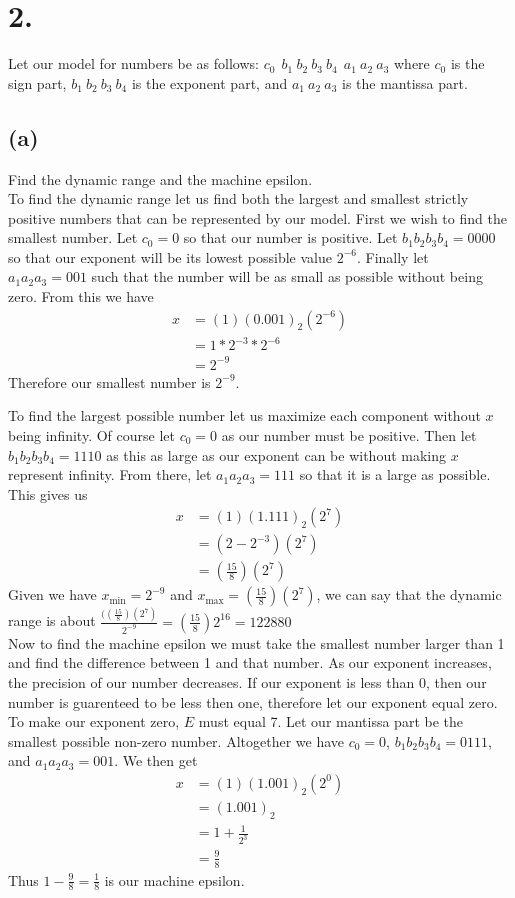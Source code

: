 \documentclass{article}
\begin{document}
\section*{2.}
	Let our model for numbers be as follows: $c_0 \ \ b_1 \ b_2 \ b_3 \ b_4
	\ \ a_1 \ a_2 \ a_3$ where $c_0$ is the sign part, $b_1 \ b_2 \ b_3 \ b_4$ is the exponent part,
	and $a_1 \ a_2 \ a_3$ is the mantissa part.
	\subsection*{(a)}
		Find the dynamic range and the machine epsilon. \\

		To find the dynamic range let us find both the largest and smallest strictly positive 
		numbers that can be represented by our model.
		First we wish to find the smallest number. Let $c_0 = 0$ so that our number is positive.
		Let $b_1 b_2 b_3 b_4 = 0000$ so that our exponent will be its lowest possible value $2^{-6}$.
		Finally let $a_1a_2a_3 = 001$ such that the number will be as small as possible without being zero.
		From this we have 
		\begin{align*}
			x & =(1)(0.001)_2(2^{-6})\\
			& = 1 * 2^{-3}*2^{-6} \\
			& = 2^{-9}
		\end{align*}
		Therefore our smallest number is $2^{-9}$.

		To find the largest possible number let us maximize each component without $x$ being infinity.
		Of course let $c_0 = 0$ as our number must be positive.
		Then let $b_1 b_2 b_3 b_4 = 1110$ as this as large as our exponent can be without making $x$ represent infinity.
		From there, let $a_1 a_2 a_3 = 111$ so that it is a large as possible.
		This gives us
		\begin{align*}
			x & = (1)(1.111)_2(2^{7}) \\
			& = (2 - 2^{-3})(2^{7}) \\ 
			& = (\frac{15}{8})(2^7)
		\end{align*}
		Given we have $x_{\text{min}} = 2^{-9}$ and $x_{\text{max}} = (\frac{15}{8})(2^7)$, we can say that the dynamic range
		is about $\frac{((\frac{15}{8})(2^7)}{2^{-9}} = (\frac{15}{8})2^{16} = 122880$ \\

		Now to find the machine epsilon we must take the smallest number larger than 1 and find the difference between 1 and that number.
		As our exponent increases, the precision of our number decreases.
		If our exponent is less than 0, then our number is guarenteed to be less then one, therefore let our exponent equal zero.
		To make our exponent zero, $E$ must equal 7.
		Let our mantissa part be the smallest possible non-zero number.
		Altogether we have $c_0 = 0$, $b_1b_2b_3b_4 = 0111$, and $a_1a_2a_3 = 001$.
		We then get 
		\begin{align*}
			x & = (1)(1.001)_2(2^0)\\
			& = (1.001)_2 \\
			& = 1 + \frac{1}{2^3} \\
			& = \frac{9}{8}
		\end{align*}
		Thus $1 - \frac{9}{8} = \frac{1}{8}$ is our machine epsilon.
\end{document}
